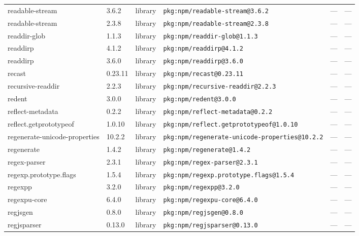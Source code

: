 \documentclass[11pt,a4paper]{article}
\begin{document}
\begin{longtable}{|p{4cm}|p{2cm}|p{1.6cm}|p{5cm}|p{1.5cm}|p{3.5cm}|}
\raggedright readable-stream & 3.6.2 & library & \small\texttt{pkg:npm/readable-stream@3.6.2} & — & \small — \\
\raggedright readable-stream & 2.3.8 & library & \small\texttt{pkg:npm/readable-stream@2.3.8} & — & \small — \\
\raggedright readdir-glob & 1.1.3 & library & \small\texttt{pkg:npm/readdir-glob@1.1.3} & — & \small — \\
\raggedright readdirp & 4.1.2 & library & \small\texttt{pkg:npm/readdirp@4.1.2} & — & \small — \\
\raggedright readdirp & 3.6.0 & library & \small\texttt{pkg:npm/readdirp@3.6.0} & — & \small — \\
\raggedright recast & 0.23.11 & library & \small\texttt{pkg:npm/recast@0.23.11} & — & \small — \\
\raggedright recursive-readdir & 2.2.3 & library & \small\texttt{pkg:npm/recursive-readdir@2.2.3} & — & \small — \\
\raggedright redent & 3.0.0 & library & \small\texttt{pkg:npm/redent@3.0.0} & — & \small — \\
\raggedright reflect-metadata & 0.2.2 & library & \small\texttt{pkg:npm/reflect-metadata@0.2.2} & — & \small — \\
\raggedright reflect.getprototypeof & 1.0.10 & library & \small\texttt{pkg:npm/reflect.getprototypeof@1.0.10} & — & \small — \\
\raggedright regenerate-unicode-properties & 10.2.2 & library & \small\texttt{pkg:npm/regenerate-unicode-properties@10.2.2} & — & \small — \\
\raggedright regenerate & 1.4.2 & library & \small\texttt{pkg:npm/regenerate@1.4.2} & — & \small — \\
\raggedright regex-parser & 2.3.1 & library & \small\texttt{pkg:npm/regex-parser@2.3.1} & — & \small — \\
\raggedright regexp.prototype.flags & 1.5.4 & library & \small\texttt{pkg:npm/regexp.prototype.flags@1.5.4} & — & \small — \\
\raggedright regexpp & 3.2.0 & library & \small\texttt{pkg:npm/regexpp@3.2.0} & — & \small — \\
\raggedright regexpu-core & 6.4.0 & library & \small\texttt{pkg:npm/regexpu-core@6.4.0} & — & \small — \\
\raggedright regjsgen & 0.8.0 & library & \small\texttt{pkg:npm/regjsgen@0.8.0} & — & \small — \\
\raggedright regjsparser & 0.13.0 & library & \small\texttt{pkg:npm/regjsparser@0.13.0} & — & \small — \\

\end{longtable}
\end{document}
